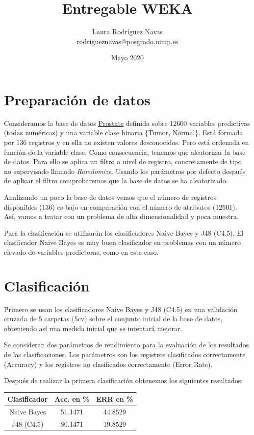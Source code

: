 \documentclass{article}
\title{Entregable WEKA}
\author{Laura Rodríguez Navas \\ rodrigueznavas@posgrado.uimp.es}
\date{Mayo 2020}
\begin{document}
	
	\maketitle
	
	\section*{Preparación de datos}
	
	Consideramos la base de datos \href{https://poliformat.upv.es/portal/site/ESP_0_2718/page/4b26ee25-8292-4b01-ae40-2c81d8a63ebd}{Prostate} definida sobre 12600 variables predictivas (todas numéricas) y una variable clase binaria \{Tumor, Normal\}. Está formada por 136 registros y en ella no existen valores desconocidos. Pero está ordenada en función de la variable clase. Como consecuencia, tenemos que aleatorizar la base de datos. Para ello se aplica un filtro a nivel de registro, concretamente de tipo no supervisado llamado \textit{Ramdomize}. Usando los parámetros por defecto después de aplicar el filtro comprobaremos que la base de datos se ha aleatorizado.
	
	Analizando un poco la base de datos vemos que el número de registros disponibles (136) es bajo en comparación con el número de atributos (12601). Así, vamos a tratar con un problema de alta dimensionalidad y poca muestra.
	
	Para la clasificación se utilizarán los clasificadores Naive Bayes y J48 (C4.5). El clasificador Naive Bayes es muy buen clasificador en problemas con un número elevado de variables predictoras, como en este caso.
	
	\section*{Clasificación}
	
	Primero se usan los clasificadores Naive Bayes y J48 (C4.5) en una validación cruzada de 5 carpetas (5cv) sobre el conjunto inicial de la base de datos, obteniendo así una medida inicial que se intentará mejorar.
	
	Se consideran dos parámetros de rendimiento para la evaluación de los resultados de las clasificaciones. Los parámetros son los registros clasificados correctamente (Accuracy) y los registros no clasificados correctamente (Error Rate). 
	
	Después de realizar la primera clasificación obtenemos los siguientes resultados:
	
	\begin{center}
		\begin{tabular}{ |c|c|c| } 
			\hline
			Clasificador & Acc. en \% & ERR en \% \\
			\hline
			Naive Bayes & 51.1471 & 44.8529 \\ 
			J48 (C4.5) & 80.1471 & 19.8529 \\ 
			\hline
		\end{tabular}
	\end{center}
	
\end{document}
